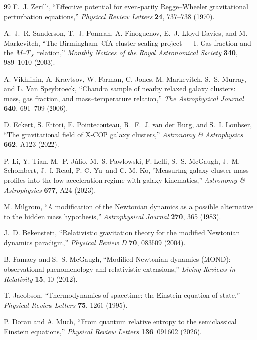 \documentclass[11pt]{article}
\begin{document}
\begin{thebibliography}{99}
F.~J. Zerilli,
``Effective potential for even-parity Regge--Wheeler gravitational perturbation equations,''
\emph{Physical Review Letters} \textbf{24}, 737--738 (1970).

A.~J.~R. Sanderson, T.~J. Ponman, A. Finoguenov, E.~J. Lloyd-Davies, and M. Markevitch,
``The Birmingham--CfA cluster scaling project --- I. Gas fraction and the $M$--$T_X$ relation,''
\emph{Monthly Notices of the Royal Astronomical Society} \textbf{340}, 989--1010 (2003).

A. Vikhlinin, A. Kravtsov, W. Forman, C. Jones, M. Markevitch, S.~S. Murray, and L. Van Speybroeck,
``Chandra sample of nearby relaxed galaxy clusters: mass, gas fraction, and mass--temperature relation,''
\emph{The Astrophysical Journal} \textbf{640}, 691--709 (2006).

D. Eckert, S. Ettori, E. Pointecouteau, R.~F.~J. van der Burg, and S.~I. Loubser,
``The gravitational field of X-COP galaxy clusters,''
\emph{Astronomy \& Astrophysics} \textbf{662}, A123 (2022).

P. Li, Y. Tian, M.~P. J\'ulio, M.~S. Pawlowski, F. Lelli, S.~S. McGaugh, J.~M. Schombert, J.~I. Read, P.-C. Yu, and C.-M. Ko,
``Measuring galaxy cluster mass profiles into the low-acceleration regime with galaxy kinematics,''
\emph{Astronomy \& Astrophysics} \textbf{677}, A24 (2023).

M. Milgrom,
``A modification of the Newtonian dynamics as a possible alternative to the hidden mass hypothesis,''
\emph{Astrophysical Journal} \textbf{270}, 365 (1983).

J.~D. Bekenstein,
``Relativistic gravitation theory for the modified Newtonian dynamics paradigm,''
\emph{Physical Review D} \textbf{70}, 083509 (2004).

B. Famaey and S.~S. McGaugh,
``Modified Newtonian dynamics (MOND): observational phenomenology and relativistic extensions,''
\emph{Living Reviews in Relativity} \textbf{15}, 10 (2012).

T. Jacobson,
``Thermodynamics of spacetime: the Einstein equation of state,''
\emph{Physical Review Letters} \textbf{75}, 1260 (1995).

P. Dorau and A. Much,
``From quantum relative entropy to the semiclassical Einstein equations,''
\emph{Physical Review Letters} \textbf{136}, 091602 (2026).


\end{thebibliography}
\end{document}
